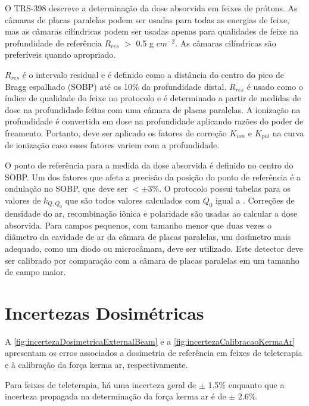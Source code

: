 \documentclass[11pt,a4paper]{article}
\begin{document}
	O TRS-398 descreve a determinação da dose absorvida em feixes de prótons. As câmaras de placas paralelas podem ser usadas para todas as energias de feixe, mas as câmaras cilíndricas podem ser usadas apenas para qualidades de feixe na profundidade de referência $R_{res}$ $>$ 0.5 g $cm^{-2}$. As câmaras cilíndricas são preferíveis quando apropriado. 
	
	$R_{res}$ é o intervalo residual e é definido como a distância do centro do pico de Bragg espalhado (SOBP) até os 10\% da profundidade distal. $R_{res}$ é usado como o índice de qualidade do feixe no protocolo e é determinado a partir de medidas de dose na profundidade feitas com uma câmara de placas paralelas. A ionização na profundidade é convertida em dose na profundidade aplicando razões do poder de freamento. Portanto, deve ser aplicado os fatores de correção $K_{ion}$ e $K_{pol}$ na curva de ionização caso esses fatores variem com a profundidade.

	O ponto de referência para a medida da dose absorvida é definido no centro do SOBP. Um dos fatores que afeta a precisão da posição do ponto de referência é a ondulação no SOBP, que deve ser $< \pm 3$\%. O protocolo possui tabelas para os valores de $k_{Q,Q_0}$ que são todos valores calculados com $Q_0$ igual a . Correções de densidade do ar, recombinação iônica e polaridade são usadas ao calcular a dose absorvida. Para campos pequenos, com tamanho menor que duas vezes o diâmetro da cavidade de ar da câmara de placas paralelas, um dosímetro mais adequado, como um diodo ou microcâmara, deve ser utilizado. Este detector deve ser calibrado por comparação com a câmara de placas paralelas em um tamanho de campo maior.

\section{Incertezas Dosimétricas}

	A \ref{fig:incertezaDosimetricaExternalBeam} e a \ref{fig:incertezaCalibracaoKermaAr} apresentam os erros associados a dosimetria de referência em feixes de teleterapia e à calibração da força kerma ar, respectivamente. 

	Para feixes de teleterapia, há uma incerteza geral de $\pm$ 1.5\% enquanto que a incerteza propagada na determinação da força kerma ar é de $\pm$ 2.6\%.
\end{document}
